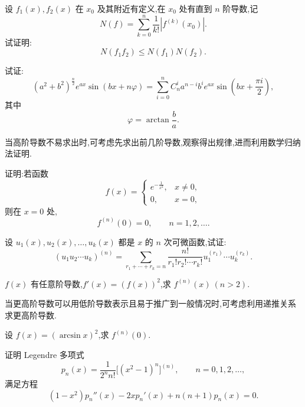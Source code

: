 \documentclass[../../数学分析培优讲义.tex]{subfiles}
\begin{document}

\begin{example}
设 $f_1(x),f_2(x)$ 在 $x_0$ 及其附近有定义,在 $x_0$ 处有直到 $n$ 阶导数,记
\[
    N(f)=\sum\limits_{k=0}^n\dfrac{1}{k!}|f^{(k)}(x_0)|.
\]
试证明:
\[
    N(f_1f_2)\leq N(f_1)N(f_2).
\]
\end{example}
\exampleblank

\begin{example}
试证:
\[
    (a^2+b^2)^{\frac{n}{2}}e^{ax}\sin(bx+n\varphi)
    =\sum\limits_{i=0}^n C_{n}^{i}a^{n-i}b^i e^{ax}
    \sin\left(bx+\dfrac{\pi i}{2}\right),
\]
其中
\[
    \varphi=\arctan\dfrac{b}{a}.
\]
\end{example}
\exampleblank




当高阶导数不易求出时,可考虑先求出前几阶导数,观察得出规律,进而利用数学归纳法证明.

\begin{example}[\markstar]
证明:若函数
\[
f(x)=
\begin{cases}
    e^{-\frac{1}{x^2}}, & x\neq0,\\
    0, & x=0,
\end{cases}
\]
则在 $x=0$ 处,
\[
    f^{(n)}(0)=0,
    \qquad n=1,2,\ldots.
\]
\end{example}
\exampleblank

\begin{example}
设 $u_1(x),u_2(x),\ldots,u_k(x)$ 都是 $x$ 的 $n$ 次可微函数,试证:
\[
    (u_1u_2\cdots u_k)^{(n)}
    =\sum\limits_{r_1+\cdots+r_k=n}
    \dfrac{n!}{r_1!r_2!\cdots r_k!}
    u_1^{(r_1)}\cdots u_k^{(r_k)}.
\]
\end{example}
\exampleblank

\begin{example}[\markstar]
$f(x)$ 有任意阶导数,$f'(x)=(f(x))^2$,求 $f^{(n)}(x)\ (n>2)$.
\end{example}
\exampleblank




当更高阶导数可以用低阶导数表示且易于推广到一般情况时,可考虑利用递推关系求更高阶导数.

\begin{example}
设 $f(x)=(\arcsin x)^2$,求 $f^{(n)}(0)$.
\end{example}
\exampleblank

\begin{example}
证明 Legendre 多项式
\[
    p_n(x)=\dfrac{1}{2^n n!}\bigl[(x^2-1)^n\bigr]^{(n)},
    \qquad n=0,1,2,\ldots,
\]
满足方程
\[
    (1-x^2)p_n''(x)-2xp_n'(x)+n(n+1)p_n(x)=0.
\]
\end{example}
\exampleblank
\end{document}
